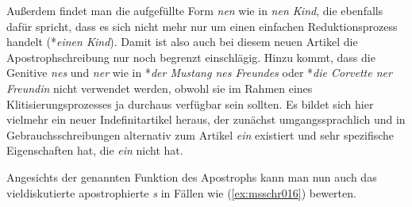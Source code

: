 \Np

\begin{exe}
  \ex\label{ex:msschr013} 
  \begin{xlist}
  \end{xlist}
\end{exe}

Außerdem findet man die aufgefüllte Form \textit{nen} wie in \textit{nen Kind}, die ebenfalls dafür spricht, dass es sich nicht mehr nur um einen einfachen Reduktionsprozess handelt (*\textit{einen Kind}).
Damit ist also auch bei diesem neuen Artikel die Apo\-stroph\-schrei\-bung nur noch begrenzt einschlägig.
Hinzu kommt, dass die Genitive \textit{nes} und \textit{ner} wie in *\textit{der Mustang nes Freundes} oder *\textit{die Corvette ner Freundin} nicht verwendet werden, obwohl sie im Rahmen eines Klitisierungsprozesses ja durchaus verfügbar sein sollten.
Es bildet sich hier vielmehr ein neuer Indefinitartikel heraus, der zunächst umgangssprachlich und in Gebrauchsschreibungen alternativ zum Artikel \textit{ein} existiert und sehr spezifische Eigenschaften hat, die \textit{ein} nicht hat.

Angesichts der genannten Funktion des Apostrophs kann man nun auch das vieldiskutierte apostrophierte \textit{s} in Fällen wie (\ref{ex:msschr016}) bewerten.

\begin{exe}
  \ex\label{ex:msschr016} 
  \begin{xlist}
  \end{xlist}
\end{exe}

